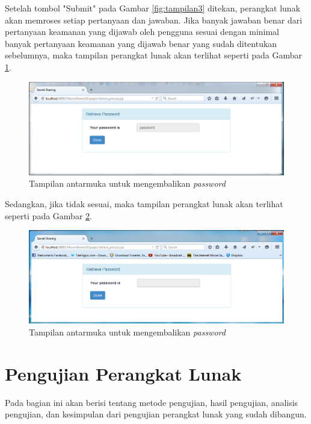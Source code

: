 Setelah tombol "Submit" pada Gambar \ref{fig:tampilan3} ditekan, perangkat lunak akan memroses setiap pertanyaan dan jawaban. Jika banyak jawaban benar dari pertanyaan keamanan yang dijawab oleh pengguna sesuai dengan minimal banyak pertanyaan keamanan yang dijawab benar yang sudah ditentukan sebelumnya, maka tampilan perangkat lunak akan terlihat seperti pada Gambar \ref{fig:tampilan4}.

\begin{figure}[H]
	\includegraphics[scale=0.5]{Gambar/tampilan4}
	\centering
	\caption{Tampilan antarmuka untuk mengembalikan \textit{password}}\label{fig:tampilan4}
\end{figure}

Sedangkan, jika tidak sesuai, maka tampilan perangkat lunak akan terlihat seperti pada Gambar \ref{fig:tampilan4_1}.

\begin{figure}[H]
	\includegraphics[scale=0.5]{Gambar/tampilan4_1}
	\centering
	\caption{Tampilan antarmuka untuk mengembalikan \textit{password}}\label{fig:tampilan4_1}
\end{figure}

\section{Pengujian Perangkat Lunak}

Pada bagian ini akan berisi tentang metode pengujian, hasil pengujian, analisis pengujian, dan kesimpulan dari pengujian perangkat lunak yang sudah dibangun.

